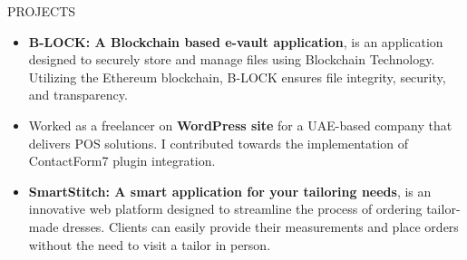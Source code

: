 \documentclass{resume} %
\begin{document}

\begin{rSection}{PROJECTS}
\begin{itemize}

    \item \textbf{B-LOCK: A Blockchain based e-vault application}{, is 
    an application designed to securely store and manage 
    files using Blockchain Technology. Utilizing the Ethereum 
    blockchain, B-LOCK ensures file integrity, security, and 
    transparency.}

\item Worked as a freelancer on \textbf{WordPress site} for a UAE-based company that delivers POS solutions. I contributed towards the implementation of ContactForm7 plugin integration.

\item \textbf{SmartStitch: A smart application for your tailoring needs}{, is an innovative web platform designed to streamline the process of ordering tailor-made dresses. Clients can easily provide their measurements and place orders without the need to visit a tailor in person.}


\end{itemize}

\end{rSection}
\end{document}
